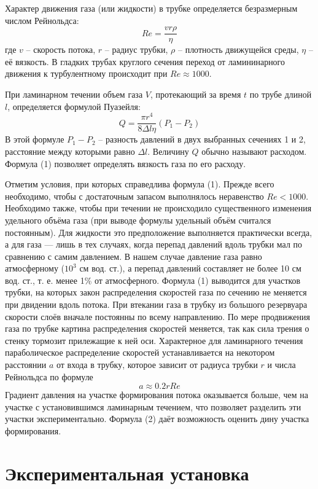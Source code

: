 \documentclass[a4paper,12pt]{article} %
\begin{document}
Характер движения газа (или жидкости) в трубке определяется безразмерным числом Рейнольдса:
\[
	Re = \frac{vr\rho}{\eta}
\]
где $v$ -- скорость потока, $r$ -- радиус трубки, $\rho$ -- плотность движущейся среды, $\eta$ -- её вязкость. В гладких трубах круглого сечения переход от ламининарного движения к турбулентному происходит при $Re \approx 1000$.

При ламинарном течении объем газа $V$, протекающий за время $t$ по трубе длиной $l$, определяется формулой Пуазейля:
\begin{equation}
	Q = \frac{\pi r^4}{8 \Delta l \eta}(P_1 - P_2)
\end{equation}
В этой формуле $P_1 - P_2$ -- разность давлений в двух выбранных сечениях 1 и 2, расстояние между которыми равно $\Delta l$. Величину $Q$ обычно называют расходом. Формула (1) позволяет определять вязкость газа по его расходу.

Отметим условия, при которых справедлива формула (1). Прежде всего необходимо, чтобы с достаточным запасом выполнялось неравенство $Re < 1000$. Необходимо также, чтобы при течении не происходило существенного изменения удельного объёма газа (при выводе формулы удельный объём считался постоянным). Для жидкости это предположение выполняется практически всегда, а для газа --- лишь в тех случаях, когда перепад давлений вдоль трубки мал по сравнению с самим давлением. В нашем случае давление газа равно атмосферному ($10^3$ см вод. ст.), а перепад давлений составляет не более 10 см вод. ст., т. е. менее 1\% от атмосферного. Формула (1) выводится для участков трубки, на которых закон распределения скоростей газа по сечению не меняется при двидении вдоль потока.
При втекании газа в трубку из большого резервуара скорости слоёв вначале постоянны по всему направлению. По мере продвижения газа по трубке картина распределения скоростей меняется, так как сила трения о стенку тормозит прилежащие к ней оси. Характерное для ламинарного течения параболическое распределение скоростей устанавливается на некотором расстоянии $a$ от входа в трубку, которое зависит от радиуса трубки $r$ и числа Рейнольдса по формуле 
\begin{equation}
	a \approx 0.2rRe
\end{equation}
Градиент давления на участке формирования потока оказывается больше, чем на участке с установившимся ламинарным течением, что позволяет разделить эти участки экспериментально. Формула (2) даёт возможность оценить дину участка формирования.

\section{Экспериментальная установка}
\end{document}
